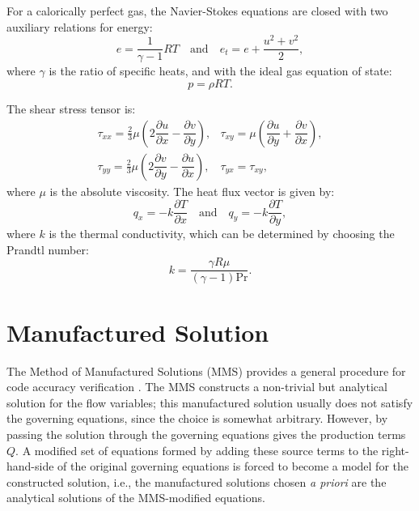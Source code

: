 \documentclass[10pt]{article}
\newcommand{\diff}[2] {\dfrac{\partial #1}{\partial #2}}
\begin{document}
For a calorically perfect gas, the Navier-Stokes equations are closed with two auxiliary relations for energy:
\begin{equation}
 \label{eq:ns2d_05}
e=\dfrac{1}{\gamma -1}RT  \quad \mbox{and} \quad e_t= e+\dfrac{u^2+v^2}{2},
\end{equation}
where $\gamma$ is the ratio of specific heats, and with the ideal gas equation of state:
\begin{equation}
 \label{eq:ns2d_07}
p=\rho RT.
\end{equation}

The shear stress tensor is:
\begin{equation}
 \begin{array}{lll}
  \tau_{xx}= \frac{2}{3}  \mu \left( 2 \diff{u}{x} - \diff{v}{y}\right), &
   \tau_{xy}= \mu \left( \diff{u}{y} + \diff{v}{x}\right), \\
 \tau_{yy}= \frac{2}{3}  \mu \left( 2 \diff{v}{y} - \diff{u}{x}\right), &
 \tau_{yx}= \tau_{xy},
 \end{array}
\end{equation}
where $\mu$ is the absolute viscosity. The heat flux vector is given by:
\begin{equation}
 q_x = - k \diff{T}{x} \quad \mbox{and}\quad q_y = - k \diff{T}{y},
 \end{equation}
where $k$ is the thermal conductivity, which can be determined by choosing the Prandtl number:
$$k= \dfrac{\gamma R \mu}{ (\gamma-1) \text{Pr}}.$$




\section{Manufactured Solution}
The Method of Manufactured Solutions (MMS) provides a general procedure for  code accuracy verification \citep{Roache2002,Bond2007}. %
%
The MMS constructs a non-trivial but analytical solution for the flow variables; this manufactured
solution usually does not  satisfy the governing equations, since the choice is somewhat arbitrary. However, by passing the solution through the governing equations gives the production terms $Q$. A modified set of equations formed by adding these source terms to the right-hand-side of the original governing equations is forced to become a model for the constructed solution, i.e., the manufactured solutions chosen \textit{a priori} are the analytical solutions of the MMS-modified equations.
\end{document}
